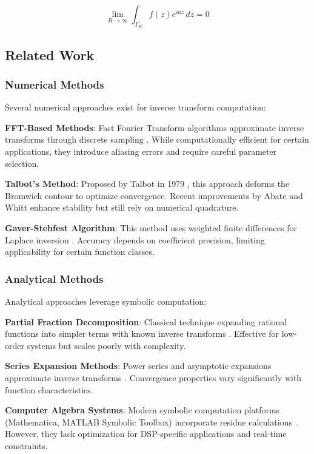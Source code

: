 \documentclass[conference]{IEEEtran}
\begin{document}
\begin{equation}
\lim_{R \to \infty} \int_{\Gamma_R} f(z) e^{iaz} \, dz = 0
\end{equation}

\subsection{Related Work}

\subsubsection{Numerical Methods}

Several numerical approaches exist for inverse transform computation:

\textbf{FFT-Based Methods}: Fast Fourier Transform algorithms approximate inverse transforms through discrete sampling \cite{cooley1965}. While computationally efficient for certain applications, they introduce aliasing errors and require careful parameter selection.

\textbf{Talbot's Method}: Proposed by Talbot in 1979 \cite{talbot1979}, this approach deforms the Bromwich contour to optimize convergence. Recent improvements by Abate and Whitt \cite{abate2006} enhance stability but still rely on numerical quadrature.

\textbf{Gaver-Stehfest Algorithm}: This method uses weighted finite differences for Laplace inversion \cite{stehfest1970}. Accuracy depends on coefficient precision, limiting applicability for certain function classes.

\subsubsection{Analytical Methods}

Analytical approaches leverage symbolic computation:

\textbf{Partial Fraction Decomposition}: Classical technique expanding rational functions into simpler terms with known inverse transforms \cite{spiegel2010}. Effective for low-order systems but scales poorly with complexity.

\textbf{Series Expansion Methods}: Power series and asymptotic expansions approximate inverse transforms \cite{davies2002}. Convergence properties vary significantly with function characteristics.

\textbf{Computer Algebra Systems}: Modern symbolic computation platforms (Mathematica, MATLAB Symbolic Toolbox) incorporate residue calculations \cite{maxima2020}. However, they lack optimization for DSP-specific applications and real-time constraints.
\end{document}
